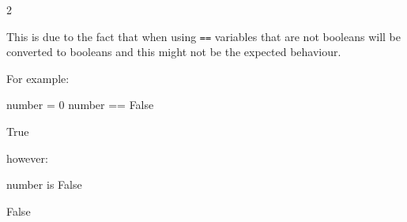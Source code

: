 \begin{raw}
2
\end{raw}





This is due to the fact that when using \texttt{==} variables that are not booleans
will be converted to booleans and this might not be the expected behaviour.


For example:




\begin{pyin}
number = 0
number == False
\end{pyin}





\begin{raw}
True
\end{raw}





however:




\begin{pyin}
number is False
\end{pyin}





\begin{raw}
False
\end{raw}

